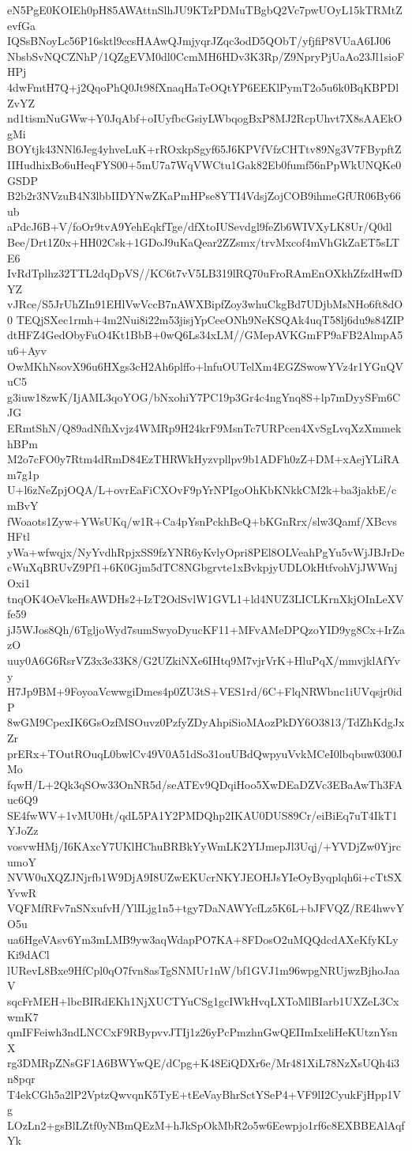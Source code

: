 eN5PgE0KOIEh0pH85AWAttnSlhJU9KTzPDMuTBgbQ2Vc7pwUOyL15kTRMtZevfGa
IQSsBNoyLc56P16sktl9ccsHAAwQJmjyqrJZqc3odD5QObT/yfjfiP8VUaA6IJ06
NbsbSvNQCZNhP/1QZgEVM0dl0CcmMH6HDv3K3Rp/Z9NpryPjUaAo23Jl1sioFHPj
4dwFmtH7Q+j2QqoPhQ0Jt98fXnaqHaTeOQtYP6EEKlPymT2o5u6k0BqKBPDlZvYZ
nd1tismNuGWw+Y0JqAbf+oIUyfbcGsiyLWbqogBxP8MJ2RcpUhvt7X8sAAEkOgMi
BOYtjk43NNl6Jeg4yhveLuK+rROxkpSgyf65J6KPVfVfzCHTtv89Ng3V7FBypftZ
IIHudhixBo6uHeqFYS00+5mU7a7WqVWCtu1Gak82Eb0fumf56nPpWkUNQKe0GSDP
B2b2r3NVzuB4N3lbbIIDYNwZKaPmHPse8YTI4VdsjZojCOB9ihmeGfUR06By66ub
aPdcJ6B+V/foOr9tvA9YehEqkfTge/dfXtoIUSevdgl9feZb6WIVXyLK8Ur/Q0dl
Bee/Drt1Z0x+HH02Csk+1GDoJ9uKaQear2ZZsmx/trvMxcof4mVhGkZaET5sLTE6
IvRdTplhz32TTL2dqDpVS//KC6t7vV5LB319lRQ70uFroRAmEnOXkhZfzdHwfDYZ
vJRce/S5JrUhZIn91EHlVwVccB7nAWXBipfZoy3whuCkgBd7UDjbMsNHo6ft8dO0
TEQjSXec1rmh+4m2Nui8i22m53jisjYpCeeONh9NeKSQAk4uqT58lj6du9s84ZIP
dtHFZ4GedObyFuO4Kt1BbB+0wQ6Ls34xLM//GMepAVKGmFP9aFB2AlmpA5u6+Ayv
OwMKhNsovX96u6HXgs3cH2Ah6plffo+lnfuOUTelXm4EGZSwowYVz4r1YGnQVuC5
g3iuw18zwK/IjAML3qoYOG/bNxohiY7PC19p3Gr4c4ngYnq8S+lp7mDyySFm6CJG
ERmtShN/Q89adNfhXvjz4WMRp9H24krF9MsnTc7URPcen4XvSgLvqXzXmmekhBPm
M2o7cFO0y7Rtm4dRmD84EzTHRWkHyzvpllpv9b1ADFh0zZ+DM+xAejYLiRAm7g1p
U+l6zNeZpjOQA/L+ovrEaFiCXOvF9pYrNPIgoOhKbKNkkCM2k+ba3jakbE/cmBvY
fWoaots1Zyw+YWsUKq/w1R+Ca4pYsnPckhBeQ+bKGnRrx/slw3Qamf/XBcvsHFtl
yWa+wfwqjx/NyYvdhRpjxSS9fzYNR6yKvlyOpri8PEl8OLVeahPgYu5vWjJBJrDe
cWuXqBRUvZ9Pf1+6K0Gjm5dTC8NGbgrvte1xBvkpjyUDLOkHtfvohVjJWWnjOxi1
tnqOK4OeVkeHsAWDHs2+IzT2OdSvlW1GVL1+ld4NUZ3LICLKrnXkjOInLeXVfe59
jJ5WJos8Qh/6TgljoWyd7sumSwyoDyucKF11+MFvAMeDPQzoYID9yg8Cx+IrZazO
uuy0A6G6RsrVZ3x3e33K8/G2UZkiNXe6IHtq9M7vjrVrK+HluPqX/mmvjklAfYvy
H7Jp9BM+9FoyoaVcwwgiDmes4p0ZU3tS+VES1rd/6C+FlqNRWbnc1iUVqsjr0idP
8wGM9CpexIK6GsOzfMSOuvz0PzfyZDyAhpiSioMAozPkDY6O3813/TdZhKdgJxZr
prERx+TOutROuqL0bwlCv49V0A51dSo31ouUBdQwpyuVvkMCeI0lbqbuw0300JMo
fqwH/L+2Qk3qSOw33OnNR5d/seATEv9QDqiHoo5XwDEaDZVc3EBaAwTh3FAuc6Q9
SE4fwWV+1vMU0Ht/qdL5PA1Y2PMDQhp2IKAU0DUS89Cr/eiBiEq7uT4IkT1YJoZz
vosvwHMj/I6KAxcY7UKlHChuBRBkYyWmLK2YIJmepJl3Uqj/+YVDjZw0YjrcumoY
NVW0uXQZJNjrfb1W9DjA9I8UZwEKUcrNKYJEOHJsYIeOyByqplqh6i+cTtSXYvwR
VQFMfRFv7nSNxufvH/YlILjg1n5+tgy7DaNAWYcfLz5K6L+bJFVQZ/RE4hwvYO5u
ua6HgeVAsv6Ym3mLMB9yw3aqWdapPO7KA+8FDosO2uMQQdcdAXeKfyKLyKi9dACl
lURevL8Bxe9HfCpl0qO7fvn8asTgSNMUr1nW/bf1GVJ1m96wpgNRUjwzBjhoJaaV
sqcFrMEH+lbcBIRdEKh1NjXUCTYuCSg1gcIWkHvqLXToMlBIarb1UXZeL3CxwmK7
qmIFFeiwh3ndLNCCxF9RBypvvJTIj1z26yPcPmzhnGwQEIImIxeliHeKUtznYsnX
rg3DMRpZNsGF1A6BWYwQE/dCpg+K48EiQDXr6e/Mr481XiL78NzXsUQh4i3n8pqr
T4ekCGh5a2lP2VptzQwvqnK5TyE+tEeVayBhrSctYSeP4+VF9lI2CyukFjHpp1Vg
LOzLn2+gsBlLZtf0yNBmQEzM+hJkSpOkMbR2o5w6Eewpjo1rf6c8EXBBEAlAqfYk
